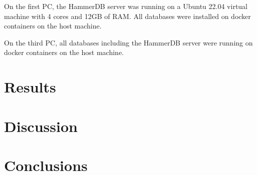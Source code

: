 On the first PC, the HammerDB server was running on a Ubuntu 22.04 virtual machine with 4 cores and 12GB of RAM. All databases were installed on docker containers on the host machine.

On the third PC, all databases including the HammerDB server were running on docker containers on the host machine.

\section{Results}
\label{sec:results}

\section{Discussion}
\label{sec:discussion}

\section{Conclusions}
\label{sec:conclusions}
